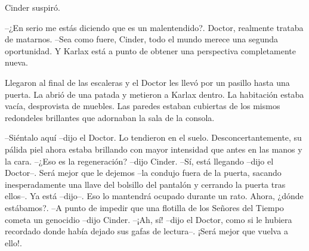 Cinder suspiró. 

--¿En serio me estás diciendo que es un malentendido?. Doctor, realmente trataba de matarnos.
--Sea como fuere, Cinder, todo el mundo merece una segunda oportunidad. Y Karlax está a punto de obtener una perspectiva completamente nueva. 

Llegaron al final de las escaleras y el Doctor les llevó por un pasillo hasta una puerta. La abrió de una patada y metieron a Karlax dentro.
La habitación estaba vacía, desprovista de muebles. Las paredes estaban cubiertas de los mismos redondeles brillantes que adornaban la sala de la consola. 

--Siéntalo aquí --dijo el Doctor. Lo tendieron en el suelo. Desconcertantemente, su pálida piel ahora estaba brillando con mayor intensidad que antes en las manos y la cara.
--¿Eso es la regeneración? --dijo Cinder.
--Sí, está llegando --dijo el Doctor--. Será mejor que le dejemos --la condujo fuera de la puerta, sacando inesperadamente una llave del bolsillo del pantalón y cerrando la puerta tras ellos--. Ya está --dijo--. Eso lo mantendrá ocupado durante un rato. Ahora, ¿dónde estábamos?.
--A punto de impedir que una flotilla de los Señores del Tiempo cometa un genocidio --dijo Cinder.
--¡Ah, sí! --dijo el Doctor, como si le hubiera recordado donde había dejado sus gafas de lectura--. ¡Será mejor que vuelva a ello!.

